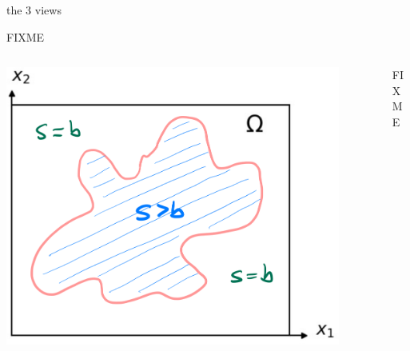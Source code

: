 \documentclass[10pt,svgnames]{beamer}
\begin{document}
\begin{frame}{the 3 views}

\vspace{-2mm}
\begin{center}
FIXME %
\end{center}

\vspace{-2mm}
\begin{columns}
\begin{column}{0.43\textwidth}
\includegraphics[width=0.9\textwidth]{mapplane}
\end{column}
\begin{column}{0.57\textwidth}
FIXME %
\end{column}
\end{columns}
\end{frame}
\end{document}
